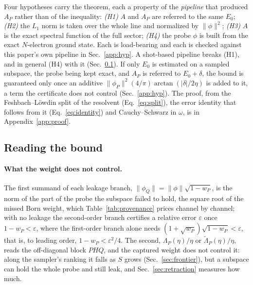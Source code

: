 Four hypotheses carry the theorem, each a property of the \emph{pipeline} that produced $A_P$ rather
than of the inequality: \emph{(H1)} $A$ and $A_P$ are referred to the same $E_0$; \emph{(H2)} the $L_1$
norm is taken over the whole line and normalized by $\lVert\phi\rVert^{2}$; \emph{(H3)} $A$ is the exact
spectral function of the full sector; \emph{(H4)} the probe $\phi$ is built from the exact $N$-electron
ground state. Each is load-bearing and each is checked against this paper's own pipeline in
Sec.~\ref{app:hyp}. A shot-based pipeline breaks (H1), and in general (H4) with it
(Sec.~\ref{sec:leakage:branches}). If only $E_0$ is estimated on a sampled subspace, the probe being
kept exact, and $A_P$ is referred to $E_0+\delta$, the bound is guaranteed only once an additive
$\lVert\phi_P\rVert^{2}(4/\pi)\arctan(\lvert\delta\rvert/2\eta)$ is added to it, a term the certificate
%
%
does not control (Sec.~\ref{app:hyp}). The proof, from the
Feshbach--L\"owdin split of the resolvent (Eq.~\eqref{eq:split}), the error identity that follows from it
(Eq.~\eqref{eq:identity}) and Cauchy--Schwarz in $\omega$, is in Appendix~\ref{app:proof}.

%
%
\subsection{Reading the bound}
\label{sec:leakage:branches}

\paragraph{What the weight does not control.} The first summand of each leakage branch, $\lVert\phi_Q\rVert=\lVert\phi\rVert\sqrt{1-w_P}$, is the norm of the part of the probe the subspace failed to hold, the square root of the missed Born weight, which Table~\ref{tab:provenance} prices channel by channel; with no leakage the second-order branch certifies a relative error $\varepsilon$ once $1-w_P<\varepsilon$, where the first-order branch alone needs $(1+\sqrt{w_P})\sqrt{1-w_P}<\varepsilon$, that is, to leading order, $1-w_P<\varepsilon^{2}/4$. The second, $\Lambda_P(\eta)/\eta$ or $\tilde\Lambda_P(\eta)/\eta$, reads the off-diagonal block $PHQ$, and the captured weight does not control it: along the sampler's ranking it falls as $S$ grows (Sec.~\ref{sec:frontier}), but a subspace can hold the whole probe and still leak, and Sec.~\ref{sec:retraction} measures how much.

%
%
%
%
